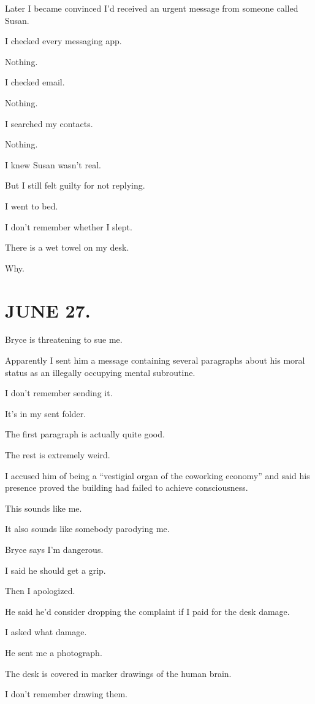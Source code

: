 \documentclass[11pt,oneside]{book}
\begin{document}
Later I became convinced I'd received an urgent message from someone called Susan.

I checked every messaging app.

Nothing.

I checked email.

Nothing.

I searched my contacts.

Nothing.

I knew Susan wasn't real.

But I still felt guilty for not replying.

I went to bed.

I don't remember whether I slept.

There is a wet towel on my desk.

Why.

\section*{JUNE 27.}

Bryce is threatening to sue me.

Apparently I sent him a message containing several paragraphs about his moral status as an illegally occupying mental subroutine.

I don't remember sending it.

It's in my sent folder.

The first paragraph is actually quite good.

The rest is extremely weird.

I accused him of being a ``vestigial organ of the coworking economy'' and said his presence proved the building had failed to achieve consciousness.

This sounds like me.

It also sounds like somebody parodying me.

Bryce says I'm dangerous.

I said he should get a grip.

Then I apologized.

He said he'd consider dropping the complaint if I paid for the desk damage.

I asked what damage.

He sent me a photograph.

The desk is covered in marker drawings of the human brain.

I don't remember drawing them.
\end{document}
